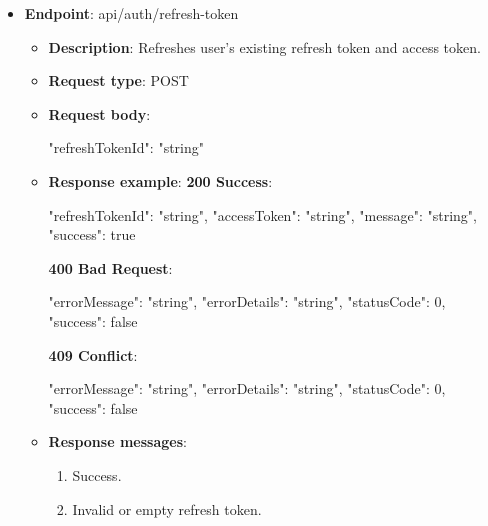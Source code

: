 \begin{itemize}
    \item \textbf{Endpoint}: api/auth/refresh-token
    \begin{itemize}
        \item \textbf{Description}: Refreshes user's existing refresh token and access token.
        \item \textbf{Request type}: POST
        \item \textbf{Request body}:
        \begin{spverbatim}
        {
            "refreshTokenId": "string"
        }
        \end{spverbatim}
        \item  \textbf{Response example}:
        \textbf{200 Success}:
        \begin{spverbatim}
        {
            "refreshTokenId": "string",
            "accessToken": "string",
            "message": "string",
            "success": true
        }
        \end{spverbatim}
        \textbf{400 Bad Request}:
        \begin{spverbatim}
        {
            "errorMessage": "string",
            "errorDetails": "string",
            "statusCode": 0,
            "success": false
        }
        \end{spverbatim}
        \textbf{409 Conflict}:
        \begin{spverbatim}
        {
            "errorMessage": "string",
            "errorDetails": "string",
            "statusCode": 0,
            "success": false
        }
        \end{spverbatim}
        \item \textbf{Response messages}:
        \begin{enumerate}
            \item Success.
            \item Invalid or empty refresh token.
        \end{enumerate}
    \end{itemize}


\end{itemize}
